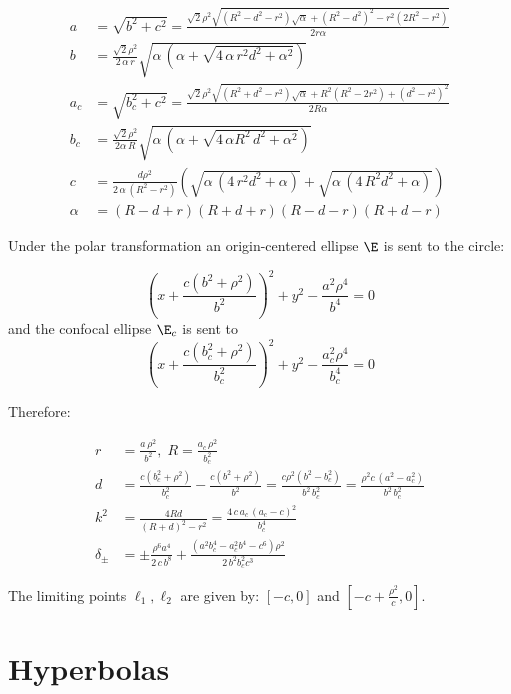  \begin{align*}
     a&= \sqrt{b^2+c^2}=\frac{\sqrt{2}\rho^2\sqrt{ (R^2 - d^2 - r^2)\sqrt{\alpha} +(R^2 - d^2)^2  - r^2(2R^2 - r^2) }}{2r\alpha} \\
     b&= {\frac {\sqrt {2}{\rho}^{2}}{2\,\alpha\,r}\sqrt {\alpha\, \left( 
\alpha+\sqrt {4\,\alpha\,{r}^{2}{d}^{2}+{\alpha}^{2}} \right) }}
 \\
     a_c&= \sqrt{b_c^2+c^2} = \frac{\sqrt{2}\rho^2\sqrt{(R^2 + d^2 - r^2)\sqrt{\alpha} + R^2(R^2 - 2r^2) + (d^2 - r^2)^2 }}{2R\alpha}\\
     b_c&= {\frac {\sqrt {2}{\rho}^{2}}{2 \alpha\,R}\sqrt {\alpha\, \left( \alpha+
\sqrt {4\,\alpha {R}^{2}\,{d}^{2}+{\alpha}^{2}} \right) }}
 \\
     c&= {\frac {d{\rho}^{2}}{2\,\alpha\, \left( R^2-r^2 \right)    } \left( \sqrt {\alpha\, \left( 4\, {r}^{2} d^2+\alpha
 \right) }+\sqrt {\alpha\, \left( 4\,{R}^{2}{d}^{2}+\alpha \right) }
 \right) }
\\
     \alpha&=(R - d + r)(R + d + r)(R - d - r)(R + d - r)
 \end{align*}
 
 Under the polar transformation an origin-centered ellipse $\E$ is sent to the circle:

\[ \left( x+{\frac {c \left( {b}^{2}+\rho^{2} \right) }{{b}^{2}}}
 \right) ^{2}+{y}^{2}-{\frac {{a}^{2}\rho^{4}}{{b}^4}}=0\]
 and the confocal ellipse $\E_c$ is sent to
 \[ \left( x+\frac {c \left( b_c^{2}+\rho^{2} \right) }{b_c^2}
 \right) ^{2}+{y}^{2}-{\frac {a_c^{2}\rho^{4}}{b_c^4}}=0\]
 
Therefore:

\begin{align*} r&=\frac{a \,\rho^2}{b^2},\; R=\frac{a_c\, \rho^2}{b_c^2}\\
d&=\frac {c \left( b_c^{2}+\rho^{2} \right) }{b_c^2}-\frac {c \left( b^{2}+\rho^{2} \right) }{b^2}=\frac{c \rho^2(b^2 - b_c^2)}{b^2\, b_c^2}=\frac{\rho^2 c\, (a^2 - a_c^2)}{b^2\, b_c^2}\\
  k^2&=\frac{4Rd}{(R+d)^2-r^2}=\frac{4 \,c\, a_c\,(a_c - c)^2    }{b_c^4}\\
  \delta_{\pm}&=\pm {\frac {\rho^{6}{a}^{4}}{2\,c\, {b}^{8}}}+{\frac { \left( {a}^{2} b_c^{4}-a_c^{2}{b}^{4}-{c}^{6} \right) \rho^{2}}{2\,{b}^{2}  b_c^{2} {c}^{3}}}
\end{align*}

 The limiting points $\ell_1,\ell_2$ are given by: $[-c,0]$ and $[-c+\frac{\rho^2}{c},0]$.
 
 
 \section{ Hyperbolas}
 
